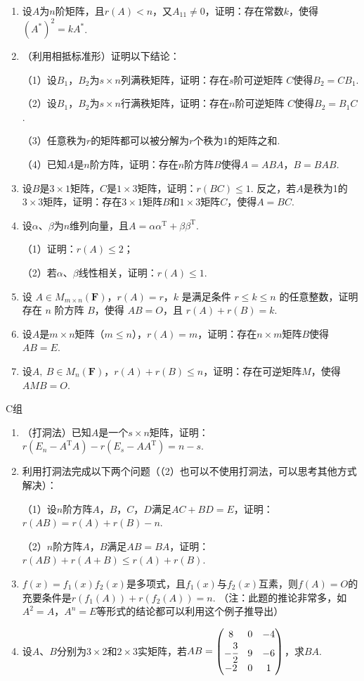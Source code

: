 \begin{enumerate}
	\item 设$A$为$n$阶矩阵，且$r(A) < n$，又$A_{11} \neq 0$，证明：存在常数$k$，使得
	$(A^*)^2=kA^*$.
	\item （利用相抵标准形）证明以下结论：
	
	（1）设$B_1$，$B_2$为$s \times n$列满秩矩阵，证明：存在$s$阶可逆矩阵
	$C$使得$B_2=CB_1$.

	（2）设$B_1$，$B_2$为$s \times n$行满秩矩阵，证明：存在$n$阶可逆矩阵
	$C$使得$B_2=B_1C$.
	
	（3）任意秩为$r$的矩阵都可以被分解为$r$个秩为$1$的矩阵之和.

	（4）已知$A$是$n$阶方阵，证明：存在$n$阶方阵$B$使得$A=ABA$，$B=BAB$.
	\item 设$B$是$3 \times 1$矩阵，$C$是$1 \times 3$矩阵，证明：$r(BC) \le 1$.
	反之，若$A$是秩为1的$3 \times 3$矩阵，证明：存在$3 \times 1$矩阵$B$和$1 \times 3$矩阵$C$，使得$A = BC$.
	\item 设$\alpha$、$\beta$为$n$维列向量，且$A=\alpha\alpha^\mathrm{T}+\beta\beta^\mathrm{T}$.
	
	（1）证明：$r(A) \le 2$；

	（2）若$\alpha$、$\beta$线性相关，证明：$r(A) \le 1$.
	\item 设 $A \in M_{m \times n}(\mathbf{F})$，$r(A)=r$，$k$ 是满足条件 $r \leq k \leq n$ 的任意整数，证明存在 $n$ 阶方阵 $B$，使得 $AB=O$，且 $r(A)+r(B)=k$.
	\item 设$A$是$m \times n$矩阵（$m \le n$），$r(A)=m$，证明：存在$n \times m$矩阵$B$使得$AB=E$.
	\item 设$A,\ B \in M_n(\mathbf{F})$，$r(A)+r(B) \le n$，证明：存在可逆矩阵$M$，使得$AMB=O$.
\end{enumerate}

\centerline{\heiti C组}
\begin{enumerate}
	\item （打洞法）已知$A$是一个$s \times n$矩阵，证明：$r(E_n-A^\mathrm{T}A)-r(E_s-AA^\mathrm{T})=n-s$.
	\item 利用打洞法完成以下两个问题（（2）也可以不使用打洞法，可以思考其他方式解决）：
	
	（1）设$n$阶方阵$A$，$B$，$C$，$D$满足$AC+BD=E$，证明：$r(AB) = r(A)+r(B)-n$.
	
	（2）$n$阶方阵$A$，$B$满足$AB=BA$，证明：$r(AB)+r(A+B)\le r(A)+r(B)$.
	\item $f(x)=f_1(x)f_2(x)$是多项式，且$f_1(x)$与$f_2(x)$互素，则$f(A)=O$的充要条件是$r(f_1(A))+r(f_2(A))=n$.
	（注：此题的推论非常多，如$A^2=A$，$A^n=E$等形式的结论都可以利用这个例子推导出）
	\item 设$A$、$B$分别为$3 \times 2$和$2 \times 3$实矩阵，若$AB=\begin{pmatrix}
		8 & 0 & -4 \\ -\cfrac{3}{2} & 9 & -6 \\ -2 & 0 & 1
	\end{pmatrix}$，求$BA$.
\end{enumerate}